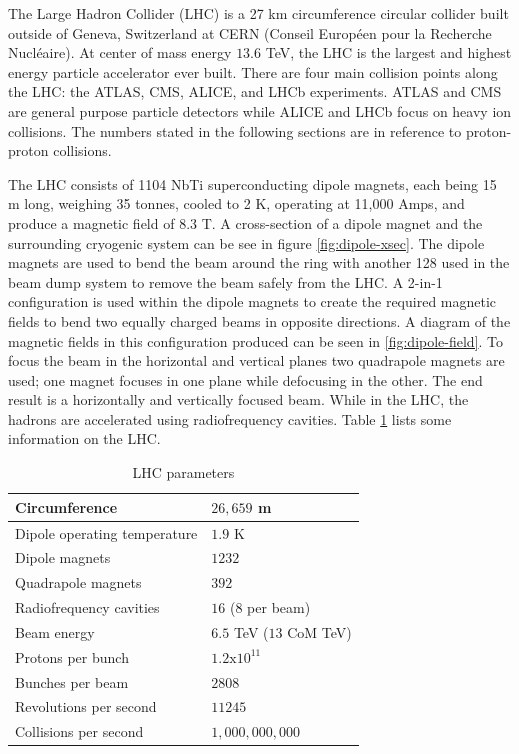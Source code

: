 		The Large Hadron Collider (LHC) is a 27 km circumference circular collider built outside of Geneva, Switzerland at CERN (Conseil Européen pour la Recherche Nucléaire). At center of mass energy $13.6$ TeV, the LHC is the largest and highest energy particle accelerator ever built. There are four main collision points along the LHC: the ATLAS, CMS, ALICE, and LHCb experiments. ATLAS and CMS are general purpose particle detectors while ALICE and LHCb focus on heavy ion collisions. The numbers stated in the following sections are in reference to proton-proton collisions.

		The LHC consists of 1104 NbTi superconducting dipole magnets, each being 15 m long, weighing 35 tonnes, cooled to 2 K, operating at 11,000 Amps, and produce a magnetic field of 8.3 T. A cross-section of a dipole magnet and the surrounding cryogenic system can be see in figure \ref{fig:dipole-xsec}. The dipole magnets are used to bend the beam around the ring with another 128 used in the beam dump system to remove the beam safely from the LHC. A 2-in-1 configuration is used within the dipole magnets to create the required magnetic fields to bend two equally charged beams in opposite directions. A diagram of the magnetic fields in this configuration produced can be seen in \ref{fig:dipole-field}. To focus the beam in the horizontal and vertical planes two quadrapole magnets are used; one magnet focuses in one plane while defocusing in the other. The end result is a horizontally and vertically focused beam. While in the LHC, the hadrons are accelerated using radiofrequency cavities. Table \ref{tab:LHC} lists some information on the LHC. 

		\begin{table}[!thp]
			\centering
			\caption{LHC parameters  \cite{lhc-facts}}
			\begin{tabular}{| l | l |}  
			\hline
			Circumference 						& $26,659$ m 					\\ 	\hline
			Dipole operating temperature 		& $1.9$ K 						\\ 	\hline
			Dipole magnets 						& $1232$ 						\\	\hline
			Quadrapole magnets 					& $392$ 						\\	\hline
			Radiofrequency cavities 			& $16$ ($8$ per beam) 			\\ 	\hline
			Beam energy 						& $6.5$ TeV ($13$ CoM TeV) 		\\ \hline
			Protons per bunch 					& $1.2 \mathrm{x} 10^11$ 		\\ \hline
			Bunches per beam 					& $2808$ 						\\ \hline
			Revolutions per second 				& $11245$ 						\\ \hline
			Collisions per second 				& $1,000,000,000$ 				\\ \hline
			\end{tabular}
			\label{tab:LHC}
		\end{table}

